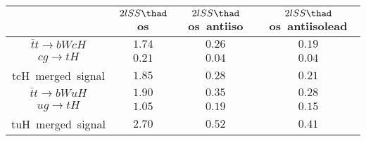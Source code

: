 \centering
\begin{tabular}{|c|c|c|c|} \hline
 & $2lSS\thad$ os & $2lSS\thad$ os~antiiso & $2lSS\thad$ os~antiisolead\\\hline
$\bar{t}t\to bWcH$ & $1.74$ & $0.26$ & $0.19$\\\hline
$cg\to tH$ & $0.21$ & $0.04$ & $0.04$\\\hline
tcH~merged~signal & $1.85$ & $0.28$ & $0.21$\\\hline
$\bar{t}t\to bWuH$ & $1.90$ & $0.35$ & $0.28$\\\hline
$ug\to tH$ & $1.05$ & $0.19$ & $0.15$\\\hline
tuH~merged~signal & $2.70$ & $0.52$ & $0.41$\\\hline
\end{tabular}
